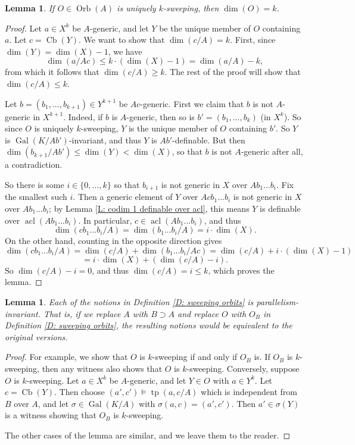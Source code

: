 \documentclass{amsart}
\newtheorem{lemma}[theorem]{Lemma}
\theoremstyle{definition}
\newcommand{\acl}{\operatorname{acl}}
\newcommand{\tp}{\operatorname{tp}}
\begin{document}
\begin{lemma}\label{L: dim of sweeping orbit}
    If $O\in\operatorname{Orb}(A)$ is uniquely $k$-sweeping, then $\dim(O)=k$.
\end{lemma}
\begin{proof}
    Let $a\in X^k$ be $A$-generic, and let $Y$ be the unique member of $O$ containing $a$. Let $c=\operatorname{Cb}(Y)$. We want to show that $\dim(c/A)=k$. First, since $\dim(Y)=\dim(X)-1$, we have $$\dim(a/Ac)\leq k\cdot(\dim(X)-1)=\dim(a/A)-k,$$ from which it follows that $\dim(c/A)\geq k$. The rest of the proof will show that $\dim(c/A)\leq k$.
    
    Let $b=(b_1,...,b_{k+1})\in Y^{k+1}$ be $Ac$-generic. First we claim that $b$ is not $A$-generic in $X^{k+1}$. Indeed, if $b$ is $A$-generic, then so is $b'=(b_1,...,b_k)$ (in $X^k$). So since $O$ is uniquely $k$-sweeping, $Y$ is the unique member of $O$ containing $b'$. So $Y$ is $\operatorname{Gal}(K/Ab')$-invariant, and thus $Y$ is $Ab'$-definable. But then $\dim(b_{k+1}/Ab')\leq\dim(Y)<\dim(X)$, so that $b$ is not $A$-generic after all, a contradiction.
    
    So there is some $i\in\{0,...,k\}$ so that $b_{i+1}$ is not generic in $X$ over $Ab_1...b_i$. Fix the smallest such $i$. Then a generic element of $Y$ over $Acb_1...b_i$ is not generic in $X$ over $Ab_1...b_i$; by Lemma \ref{L: codim 1 definable over acl}, this means $Y$ is definable over $\acl(Ab_1...b_i)$. In particular, $c\in\acl(Ab_1...b_i)$, and thus $$\dim(cb_1...b_i/A)=\dim(b_1...b_i/A)=i\cdot\dim(X).$$ On the other hand, counting in the opposite direction gives $$\dim(cb_1...b_i/A)=\dim(c/A)+\dim(b_1...b_i/Ac)=\dim(c/A)+i\cdot(\dim(X)-1)$$ $$=i\cdot\dim(X)+(\dim(c/A)-i).$$ So $\dim(c/A)-i=0$, and thus $\dim(c/A)=i\leq k$, which proves the lemma.
    \end{proof}

\begin{lemma}\label{L: sweeping invariant}
    Each of the notions in Definition \ref{D: sweeping orbits} is parallelism-invariant. That is, if we replace $A$ with $B\supset A$ and replace $O$ with $O_B$ in Definition \ref{D: sweeping orbits}, the resulting notions would be equivalent to the original versions.
\end{lemma}
\begin{proof}
    For example, we show that $O$ is $k$-sweeping if and only if $O_B$ is. If $O_B$ is $k$-sweeping, then any witness also shows that $O$ is $k$-sweeping. Conversely, suppose $O$ is $k$-sweeping. Let $a\in X^k$ be $A$-generic, and let $Y\in O$ with $a\in Y^k$. Let $c=\operatorname{Cb}(Y)$. Then choose $(a',c')\models\tp(a,c/A)$ which is independent from $B$ over $A$, and let $\sigma\in\operatorname{Gal}(K/A)$ with $\sigma(a,c)=(a',c')$. Then $a'\in\sigma(Y)$ is a witness showing that $O_B$ is $k$-sweeping.

    The other cases of the lemma are similar, and we leave them to the reader.
\end{proof}
\end{document}
